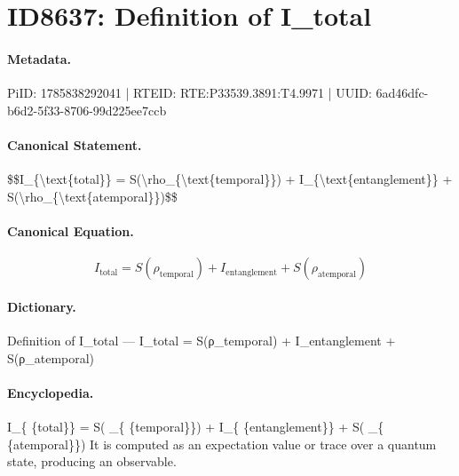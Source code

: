 \section*{ID8637: Definition of I\_total}
\paragraph{Metadata.}
PiID: 1785838292041 | RTEID: RTE:P33539.3891:T4.9971 | UUID: 6ad46dfc-b6d2-5f33-8706-99d225ee7ccb

\paragraph{Canonical Statement.}
\$\$I\_\{\textbackslash{}text\{total\}\} = S(\textbackslash{}rho\_\{\textbackslash{}text\{temporal\}\}) + I\_\{\textbackslash{}text\{entanglement\}\} + S(\textbackslash{}rho\_\{\textbackslash{}text\{atemporal\}\})\$\$

\paragraph{Canonical Equation.}
\[
I_{\text{total}} = S(\rho_{\text{temporal}}) + I_{\text{entanglement}} + S(\rho_{\text{atemporal}})
\]

\paragraph{Dictionary.}
Definition of I\_total — I\_total = S(ρ\_temporal) + I\_entanglement + S(ρ\_atemporal)

\paragraph{Encyclopedia.}
I\_\{ \{total\}\} = S( \_\{ \{temporal\}\}) + I\_\{ \{entanglement\}\} + S( \_\{ \{atemporal\}\}) It is computed as an expectation value or trace over a quantum state, producing an observable.
